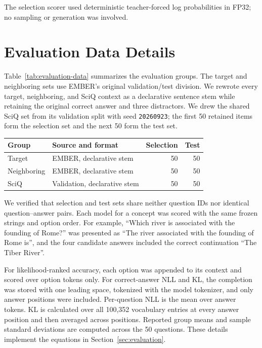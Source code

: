 The selection scorer used deterministic teacher-forced log probabilities in
FP32; no sampling or generation was involved.

\section{Evaluation Data Details}
\label{app:data}

Table~\ref{tab:evaluation-data} summarizes the evaluation groups. The
target and neighboring sets use EMBER's original validation/test division. We
rewrote every target, neighboring, and SciQ context as a declarative sentence
stem while retaining the original correct answer and three distractors. We
drew the shared SciQ set from its validation split with seed
\texttt{20260923}; the first 50 retained items form the selection set and the
next 50 form the test set.

\begin{center}
  \centering
  \scriptsize
  \begin{tabular}{llrr}
    \toprule
    Group & Source and format & Selection & Test \\
    \midrule
    Target & EMBER, declarative stem & 50 & 50 \\
    Neighboring & EMBER, declarative stem & 50 & 50 \\
    SciQ & Validation, declarative stem & 50 & 50 \\
    \bottomrule
  \end{tabular}
  \label{tab:evaluation-data}
\end{center}

We verified that selection and test sets share neither question IDs nor
identical question--answer pairs. Each model for a concept
was scored with the same frozen strings and option order. For example,
``Which river is associated with the founding of Rome?'' was presented as
``The river associated with the founding of Rome is'', and the four candidate
answers included the correct continuation ``The Tiber River''.

For likelihood-ranked accuracy, each option was appended to its context and
scored over option tokens only. For correct-answer NLL and KL, the completion
was stored with one leading space, tokenized with the model tokenizer, and
only answer positions were included. Per-question NLL is the mean over answer
tokens. KL is calculated over all 100,352 vocabulary entries at every answer
position and then averaged across positions. Reported group means and sample
standard deviations are computed across the 50 questions. These details
implement the equations in Section~\ref{sec:evaluation}.

